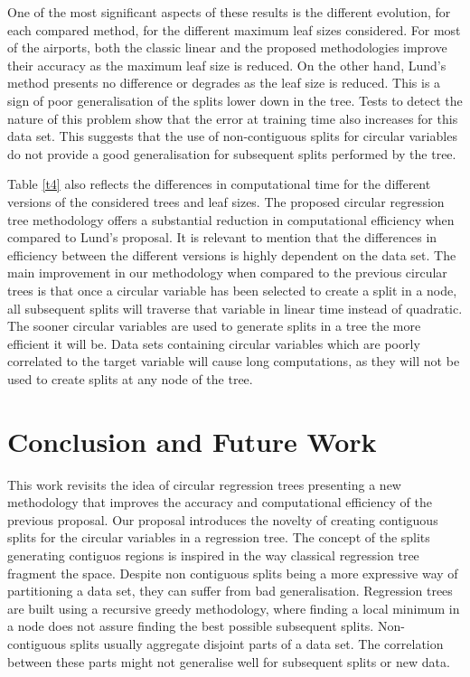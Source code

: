 \documentclass[times,twocolumn,final,authoryear]{elsarticle}
\begin{document}
One of the most significant aspects of these results is the different evolution, for each compared method, for the different maximum leaf sizes considered. For most of the airports, both the classic linear and the proposed methodologies improve their accuracy as the maximum leaf size is reduced. On the other hand, Lund's method presents no difference or degrades as the leaf size is reduced. This is a sign of poor generalisation of the splits lower down in the tree. Tests to detect the nature of this problem show that the error at training time also increases for this data set. This suggests that the use of non-contiguous splits for circular variables do not provide a good generalisation for subsequent splits performed by the tree.

Table \ref{t4} also reflects the differences in computational time for the different versions of the considered trees and leaf sizes. The proposed circular regression tree methodology offers a substantial reduction in computational efficiency when compared to Lund's proposal. It is relevant to mention that the differences in efficiency between the different versions is highly dependent on the data set. The main improvement in our methodology when compared to the previous circular trees is that once a circular variable has been selected to create a split in a node, all subsequent splits will traverse that variable in linear time instead of quadratic. The sooner circular variables are used to generate splits in a tree the more efficient it will be. Data sets containing circular variables which are poorly correlated to the target variable will cause long computations, as they will not be used to create splits at any node of the tree. 

\section{Conclusion and Future Work}
\label{sec:5}
This work revisits the idea of circular regression trees presenting a new methodology that improves the accuracy and computational efficiency of the previous proposal. Our proposal introduces the novelty of creating contiguous splits for the circular variables in a regression tree. The concept of the splits generating contiguos regions is inspired in the way classical regression tree fragment the space. Despite non contiguous splits being a more expressive way of partitioning a data set, they can suffer from bad generalisation. Regression trees are built using a recursive greedy methodology, where finding a local minimum in a node does not assure finding the best possible subsequent splits. Non-contiguous splits usually aggregate disjoint parts of a data set. The correlation between these parts might not generalise well for subsequent splits or new data.
\end{document}
